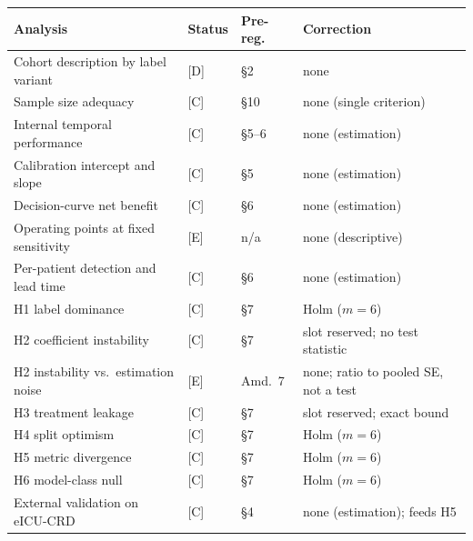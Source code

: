 \begin{table}[H]
    \centering\footnotesize\setlength{\tabcolsep}{4pt}
    \begin{tabular}{p{5.0cm}lp{1.9cm}p{4.2cm}}
        \toprule
        \textbf{Analysis} & \textbf{Status} & \textbf{Pre-reg.}
        & \textbf{Correction} \\
        \midrule
        Cohort description by label variant       & [D] & \S2     & none                                   \\
        Sample size adequacy                      & [C] & \S10    & none (single criterion)                \\
        Internal temporal performance             & [C] & \S5--6  & none (estimation)                      \\
        Calibration intercept and slope           & [C] & \S5     & none (estimation)                      \\
        Decision-curve net benefit                & [C] & \S6     & none (estimation)                      \\
        Operating points at fixed sensitivity     & [E] & n/a     & none (descriptive)                     \\
        Per-patient detection and lead time       & [C] & \S6     & none (estimation)                      \\
        H1 label dominance                        & [C] & \S7     & Holm ($m=6$)                           \\
        H2 coefficient instability                & [C] & \S7     & slot reserved; no test statistic       \\
        H2 instability vs.\ estimation noise      & [E] & Amd.\ 7 & none; ratio to pooled SE, not a test   \\
        H3 treatment leakage                      & [C] & \S7     & slot reserved; exact bound             \\
        H4 split optimism                         & [C] & \S7     & Holm ($m=6$)                           \\
        H5 metric divergence                      & [C] & \S7     & Holm ($m=6$)                           \\
        H6 model-class null                       & [C] & \S7     & Holm ($m=6$)                           \\
        External validation on eICU-CRD           & [C] & \S4     & none (estimation); feeds H5            \\

\end{tabular}
\end{table}

